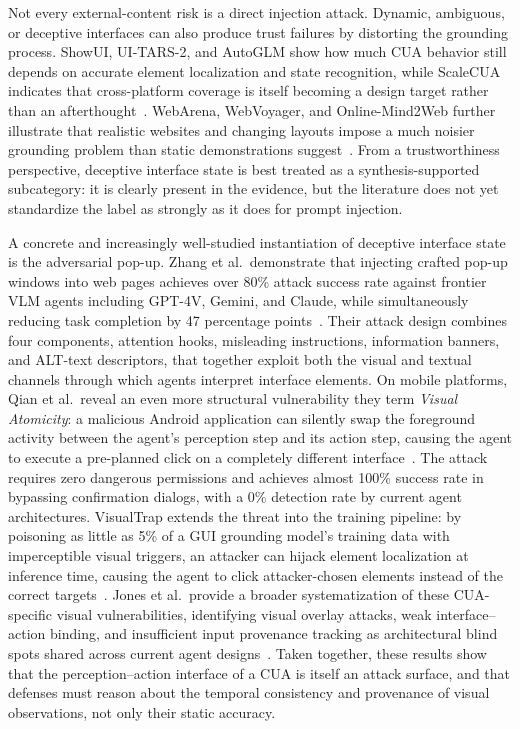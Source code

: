 Not every external-content risk is a direct injection attack. Dynamic, ambiguous, or deceptive interfaces can also produce trust failures by distorting the grounding process. ShowUI, UI-TARS-2, and AutoGLM show how much CUA behavior still depends on accurate element localization and state recognition, while ScaleCUA indicates that cross-platform coverage is itself becoming a design target rather than an afterthought~\cite{showui2024,uitars22025,autoglm2024,scalecua2025}. WebArena, WebVoyager, and Online-Mind2Web further illustrate that realistic websites and changing layouts impose a much noisier grounding problem than static demonstrations suggest~\cite{webarena2023,webvoyager2024,onlinemind2web2025}. From a trustworthiness perspective, deceptive interface state is best treated as a synthesis-supported subcategory: it is clearly present in the evidence, but the literature does not yet standardize the label as strongly as it does for prompt injection.

A concrete and increasingly well-studied instantiation of deceptive interface state is the adversarial pop-up. Zhang et al.\ demonstrate that injecting crafted pop-up windows into web pages achieves over 80\% attack success rate against frontier VLM agents including GPT-4V, Gemini, and Claude, while simultaneously reducing task completion by 47 percentage points~\cite{popupattack2024}. Their attack design combines four components, attention hooks, misleading instructions, information banners, and ALT-text descriptors, that together exploit both the visual and textual channels through which agents interpret interface elements. On mobile platforms, Qian et al.\ reveal an even more structural vulnerability they term \emph{Visual Atomicity}: a malicious Android application can silently swap the foreground activity between the agent's perception step and its action step, causing the agent to execute a pre-planned click on a completely different interface~\cite{zeropermission2026}. The attack requires zero dangerous permissions and achieves almost 100\% success rate in bypassing confirmation dialogs, with a 0\% detection rate by current agent architectures. VisualTrap extends the threat into the training pipeline: by poisoning as little as 5\% of a GUI grounding model's training data with imperceptible visual triggers, an attacker can hijack element localization at inference time, causing the agent to click attacker-chosen elements instead of the correct targets~\cite{visualtrap2025}. Jones et al.\ provide a broader systematization of these CUA-specific visual vulnerabilities, identifying visual overlay attacks, weak interface--action binding, and insufficient input provenance tracking as architectural blind spots shared across current agent designs~\cite{jonesSystematization2025}. Taken together, these results show that the perception--action interface of a CUA is itself an attack surface, and that defenses must reason about the temporal consistency and provenance of visual observations, not only their static accuracy.

